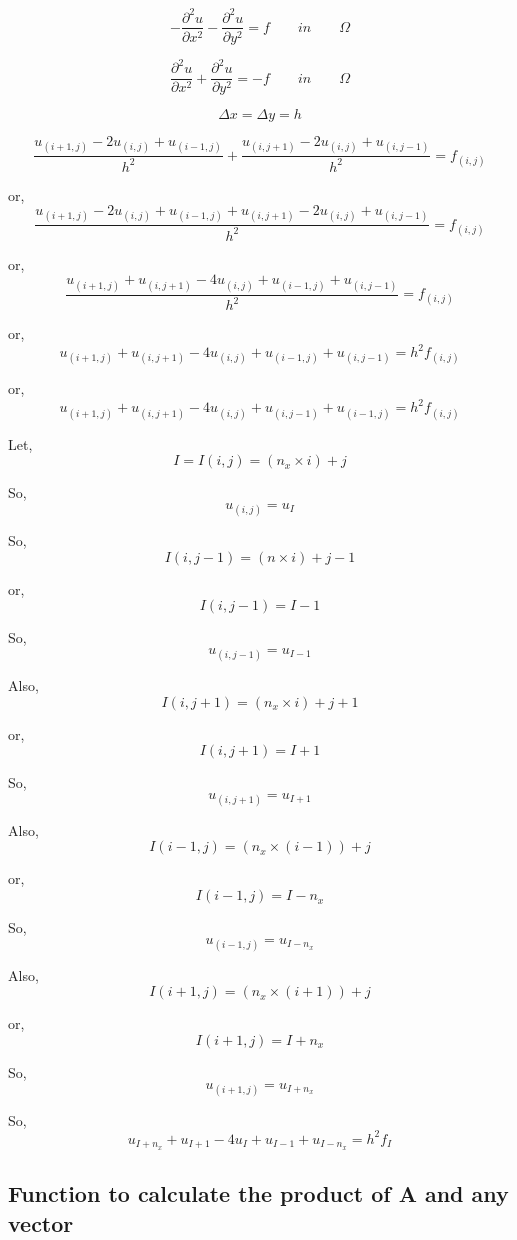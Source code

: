 \documentclass[11pt]{article}
\begin{document}
    \[-\frac{\partial^2 u}{\partial x^2 } -\frac{\partial^2 u}{\partial y^2 } = f\qquad in \qquad \Omega\]

    \[\frac{\partial^2 u}{\partial x^2 } + \frac{\partial^2 u}{\partial y^2 } = -f\qquad in \qquad \Omega\]

    \[\Delta x = \Delta y = h\]

    \[\frac{u_{(i+1,j)} - 2u_{(i,j)} + u_{(i-1,j)}}{h^2 } + \frac{u_{(i,j+1)} - 2u_{(i,j)} + u_{(i,j-1)}}{h^2 } = f_{(i,j)}\]

    or,
\[\frac{u_{(i+1,j)} - 2u_{(i,j)} + u_{(i-1,j)} + u_{(i,j+1)} - 2u_{(i,j)} + u_{(i,j-1)}}{h^2 } = f_{(i,j)}\]

    or,
\[\frac{u_{(i+1,j)} + u_{(i,j+1)} - 4u_{(i,j)} + u_{(i-1,j)} + u_{(i,j-1)}}{h^2 } = f_{(i,j)}\]

    or,
\[u_{(i+1,j)} + u_{(i,j+1)} - 4u_{(i,j)} + u_{(i-1,j)} + u_{(i,j-1)} = h^2f_{(i,j)}\]

    or,
\[u_{(i+1,j)} + u_{(i,j+1)} - 4u_{(i,j)} + u_{(i,j-1)} + u_{(i-1,j)} = h^2f_{(i,j)}\]

    Let, \[I = I(i,j) = (n_x \times i) + j\]

    So, \[u_{(i,j)} = u_{I}\]

    So, \[I(i,j-1) = (n \times i) + j - 1\]

    or, \[I(i,j-1) = I - 1\]

    So, \[u_{(i,j-1)} = u_{I-1}\]

    Also, \[I(i,j+1) = (n_x \times i) + j + 1\]

    or, \[I(i,j+1) = I + 1\]

    So, \[u_{(i,j+1)} = u_{I+1}\]

    Also, \[I(i-1,j) = (n_x \times (i-1)) + j\]

    or, \[I(i-1,j) = I - n_x\]

    So, \[u_{(i-1,j)} = u_{I-n_x}\]

    Also, \[I(i+1,j) = (n_x \times (i+1)) + j\]

    or, \[I(i+1,j) = I + n_x\]

    So, \[u_{(i+1,j)} = u_{I + n_x}\]

    So, \[u_{I+n_x} + u_{I+1} - 4u_{I} + u_{I-1} + u_{I-n_x} = h^2f_{I}\]

    \hypertarget{function-to-calculate-the-product-of-a-and-any-vector}{%
\subsection{Function to calculate the product of A and any
vector}\label{function-to-calculate-the-product-of-a-and-any-vector}}
\end{document}
